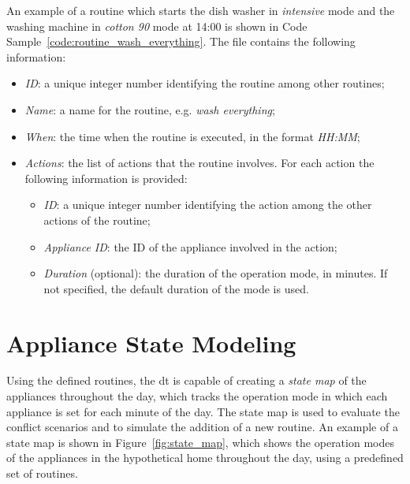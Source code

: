 An example of a routine which starts the dish washer in \textit{intensive} mode and the washing machine in \textit{cotton 90} mode at 14:00 is shown in Code Sample~\ref{code:routine_wash_everything}. The file contains the following information:
\begin{itemize}
    \item \textit{ID}: a unique integer number identifying the routine among other routines;
    \item \textit{Name}: a name for the routine, e.g. \textit{wash everything};
    \item \textit{When}: the time when the routine is executed, in the format \textit{HH:MM};
    \item \textit{Actions}: the list of actions that the routine involves. For each action the following information is provided:
          \begin{itemize}
              \item \textit{ID}: a unique integer number identifying the action among the other actions of the routine;
              \item \textit{Appliance ID}: the ID of the appliance involved in the action;
              \item \textit{Duration} (optional): the duration of the operation mode, in minutes. If not specified, the default duration of the mode is used.
          \end{itemize}
\end{itemize}



\section{Appliance State Modeling}

Using the defined routines, the \acrshort{dt} is capable of creating a \textit{state map} of the appliances throughout the day, which tracks the operation mode in which each appliance is set for each minute of the day. The state map is used to evaluate the conflict scenarios and to simulate the addition of a new routine. An example of a state map is shown in Figure~\ref{fig:state_map}, which shows the operation modes of the appliances in the hypothetical home throughout the day, using a predefined set of routines.

